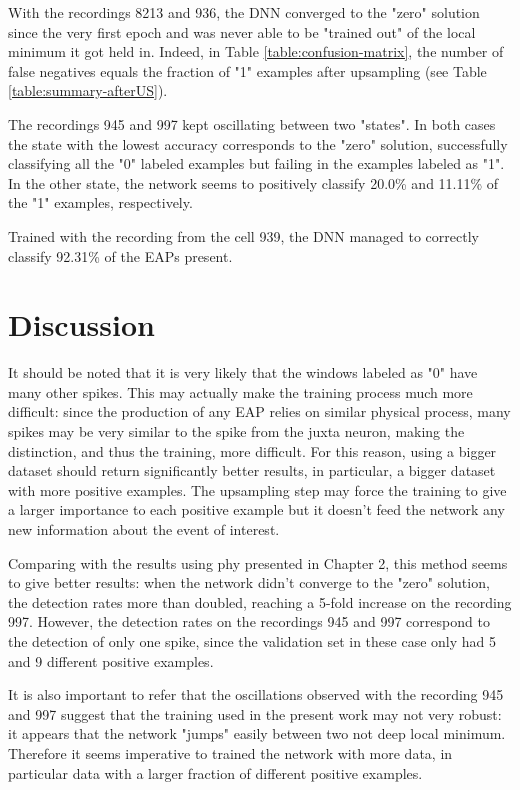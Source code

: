 With the recordings 8213 and 936, the DNN converged to the "zero" solution since the very first epoch and was never able to be "trained out" of the local minimum it got held in. Indeed, in Table \ref{table:confusion-matrix}, the number of false negatives equals the fraction of "1" examples after upsampling (see Table \ref{table:summary-afterUS}).

The recordings 945 and 997 kept oscillating between two "states". In both cases the state with the lowest accuracy corresponds to the "zero" solution, successfully classifying all the "0" labeled examples but failing in the examples labeled as "1". In the other state, the network seems to positively classify 20.0\% and 11.11\% of the "1" examples, respectively.

Trained with the recording from the cell 939, the DNN managed to correctly classify 92.31\% of the EAPs present. 

\section{Discussion}

It should be noted that it is very likely that the windows labeled as "0" have many other spikes. This may actually make the training process much more difficult: since the production of any EAP relies on similar physical process, many spikes may be very similar to the spike from the juxta neuron, making the distinction, and thus the training, more difficult. For this reason, using a bigger dataset should return significantly better results, in particular, a bigger dataset with more positive examples. The upsampling step may force the training to give a larger importance to each positive example but it doesn't feed the network any new information about the event of interest.

Comparing with the results using phy presented in Chapter 2, this method seems to give better results: when the network didn't converge to the "zero" solution, the detection rates more than doubled, reaching a 5-fold increase on the recording 997. However, the detection rates on the recordings 945 and 997 correspond to the detection of only one spike, since the validation set in these case only had 5 and 9 different positive examples. 

It is also important to refer that the oscillations observed with the recording 945 and 997 suggest that the training used in the present work may not very robust: it appears that the network "jumps" easily between two not deep local minimum. Therefore it seems imperative to trained the network with more data, in particular data with a larger fraction of different positive examples.

